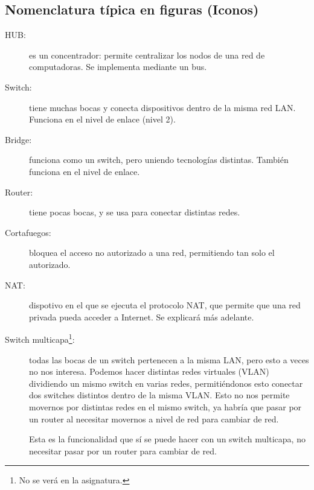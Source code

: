\subsection{Nomenclatura típica en figuras (Iconos)}
\begin{description}
    \item[HUB:] es un concentrador: permite centralizar los nodos de una red de computadoras. Se implementa mediante un bus.
    \item[Switch:] tiene muchas bocas y conecta dispositivos dentro de la misma red \acrshort{LAN}. Funciona en el nivel de enlace (nivel 2).
    \item[Bridge:] funciona como un switch, pero uniendo tecnologías distintas. También funciona en el nivel de enlace.
    \item[Router:] tiene pocas bocas, y se usa para conectar distintas redes. 
    \item[Cortafuegos:] bloquea el acceso no autorizado a una red, permitiendo tan solo el autorizado. 
    \item[NAT:] dispotivo en el que se ejecuta el protocolo \acrfull{NAT}, que permite que una red privada pueda acceder a Internet. Se explicará más adelante.
    \item[Switch multicapa\footnote{No se verá en la asignatura.}:] todas las bocas de un switch pertenecen a la misma \acrshort{LAN}, pero esto a veces no nos interesa. Podemos hacer distintas redes virtuales (\acrshort{VLAN}) dividiendo un mismo switch en varias redes, permitiéndonos esto conectar dos switches distintos dentro de la misma \acrshort{VLAN}. Esto no nos permite movernos por distintas redes en el mismo switch, ya habría que pasar por un router al necesitar movernos a nivel de red para cambiar de red.
    
    Esta es la funcionalidad que sí se puede hacer con un switch multicapa, no necesitar pasar por un router para cambiar de red.
\end{description}

